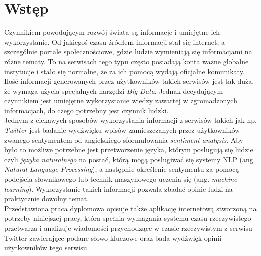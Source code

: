 \chapter{Wstęp}
Czynnikiem powodującym rozwój świata są informacje i umiejętne ich wykorzystanie. Od jakiegoś czasu źródłem informacji stał się internet, a szczególnie portale społecznościowe, gdzie ludzie wymieniają się informacjami na różne tematy. To na serwisach tego typu często posiadają konta ważne globalne instytucje i stało się normalne, że za ich pomocą wydają oficjalne komunikaty. Ilość informacji generowanych przez użytkowników takich serwisów jest tak duża, że wymaga użycia specjalnych narzędzi \textit{Big Data}. Jednak decydującym czynnikiem jest umiejętne wykorzystanie wiedzy zawartej w zgromadzonych informacjach, do czego potrzebny jest czynnik ludzki. \\
Jednym z ciekawych sposobów wykorzystania informacji z serwisów takich jak np. \textit{Twitter} jest badanie wydźwięku wpisów zamieszczanych przez użytkowników zwanego sentymentem od angielskiego sformułowania \textit{sentiment analysis}. Aby było to możliwe potrzebne jest przetworzenie języka, którym posługują się ludzie czyli \textit{języka naturalnego} na postać, którą mogą posługiwać się systemy NLP (ang. \textit{Natural Language Processing}), a następnie określenie sentymentu za pomocą podejścia słownikowego lub technik maszynowego uczenia się (ang. \textit{machine learning}). Wykorzystanie takich informacji pozwala zbadać opinie ludzi na praktycznie dowolny temat. \\
Przedstawiona praca dyplomowa opisuje także aplikację internetową stworzoną na potrzeby niniejszej pracy, która spełnia wymagania systemu czasu rzeczywistego - przetwarza i analizuje wiadomości przychodzące w czasie rzeczywistym z serwisu Twitter zawierające podane słowo kluczowe oraz bada wydźwięk opinii użytkowników tego serwisu.